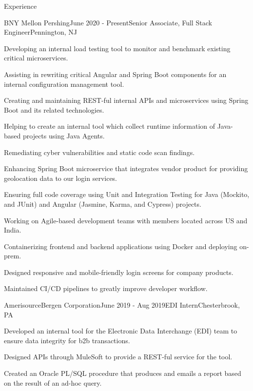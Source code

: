 \documentclass[
	11pt, %
]{resume} %
\begin{document}
\begin{rSection}{Experience}

	\begin{rSubsection}{BNY Mellon \textbar{} Pershing}{June 2020 - Present}{Senior Associate, Full Stack Engineer}{Pennington, NJ}
		\item Developing an internal load testing tool to monitor and benchmark existing critical microservices.
		\item Assisting in rewriting critical Angular and Spring Boot components for an internal configuration management tool.
		\item Creating and maintaining REST-ful internal APIs and microservices using Spring Boot and its related technologies.
		\item Helping to create an internal tool which collect runtime information of Java-based projects using Java Agents.
		\item Remediating cyber vulnerabilities and static code scan findings.
		\item Enhancing Spring Boot microservice that integrates vendor product for providing geolocation data to our login services.
		\item Ensuring full code coverage using Unit and Integration Testing for Java (Mockito, and JUnit) and Angular (Jasmine, Karma, and Cypress) projects.
		\item Working on Agile-based development teams with members located across US and India.
		\item Containerizing frontend and backend applications using Docker and deploying on-prem.
		\item Designed responsive and mobile-friendly login screens for company products.
		\item Maintained CI/CD pipelines to greatly improve developer workflow.
	\end{rSubsection}


	\begin{rSubsection}{AmerisourceBergen Corporation}{June 2019 - Aug 2019}{EDI Intern}{Chesterbrook, PA}
		\item Developed an internal tool for the Electronic Data Interchange (EDI) team to ensure data integrity for b2b transactions.
		\item Designed APIs through MuleSoft to provide a REST-ful service for the tool.
		\item Created an Oracle PL/SQL procedure that produces and emails a report based on the result of an ad-hoc query.
	\end{rSubsection}


\end{rSection}
\end{document}
